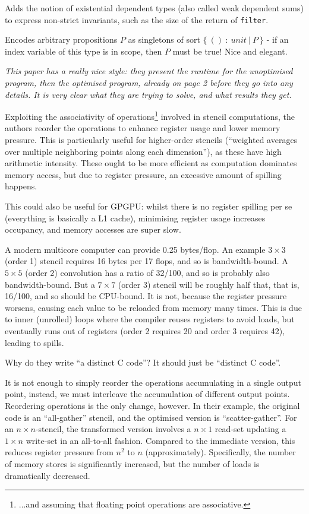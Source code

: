 \documentclass[a4paper, oneside, final]{memoir}
\begin{document}
Adds the notion of existential dependent types (also called weak
dependent sums) to express non-strict invariants, such as the size of
the return of \texttt{filter}.

Encodes arbitrary propositions $P$ as singletons of sort $\{\ ()\ :\
unit\ |\ P\ \}$ - if an index variable of this type is in scope, then
$P$ must be true!  Nice and elegant.

\begin{quote}
\end{quote}

\textit{This paper has a really nice style: they present the runtime
  for the unoptimised program, then the optimised program, already on
  page 2 before they go into any details.  It is very clear what they
  are trying to solve, and what results they get.}

Exploiting the associativity of operations\footnote{...and assuming
  that floating point operations are associative.} involved in stencil
computations, the authors reorder the operations to enhance register
usage and lower memory pressure.  This is particularly useful for
higher-order stencils (``weighted averages over multiple neighboring
points along each dimension''), as these have high arithmetic
intensity.  These ought to be more efficient as computation dominates
memory access, but due to register pressure, an excessive amount of
spilling happens.

This could also be useful for GPGPU: whilst there is no register
spilling per se (everything is basically a L1 cache), minimising
register usage increases occupancy, and memory accesses are super
slow.

A modern multicore computer can provide 0.25 bytes/flop.  An example
$3 \times 3$ (order 1) stencil requires 16 bytes per 17 flops, and so
is bandwidth-bound.  A $5 \times 5$ (order 2) convolution has a ratio
of 32/100, and so is probably also bandwidth-bound.  But a $7 \times
7$ (order 3) stencil will be roughly half that, that is, 16/100, and
so should be CPU-bound.  It is not, because the register pressure
worsens, causing each value to be reloaded from memory many times.
This is due to inner (unrolled) loops where the compiler reuses
registers to avoid loads, but eventually runs out of registers (order
2 requires 20 and order 3 requires 42), leading to spills.

Why do they write ``a distinct C code''?  It should just be ``distinct
C code''.

It is not enough to simply reorder the operations accumulating in a
single output point, instead, we must interleave the accumulation of
different output points.  Reordering operations is the only change,
however.  In their example, the original code is an ``all-gather''
stencil, and the optimised version is ``scatter-gather''.  For an $n
\times n$-stencil, the transformed version involves a $n \times 1$
read-set updating a $1 \times n$ write-set in an all-to-all fashion.
Compared to the immediate version, this reduces register pressure from
$n^{2}$ to $n$ (approximately).  Specifically, the number of memory
stores is significantly increased, but the number of loads is
dramatically decreased.
\end{document}
